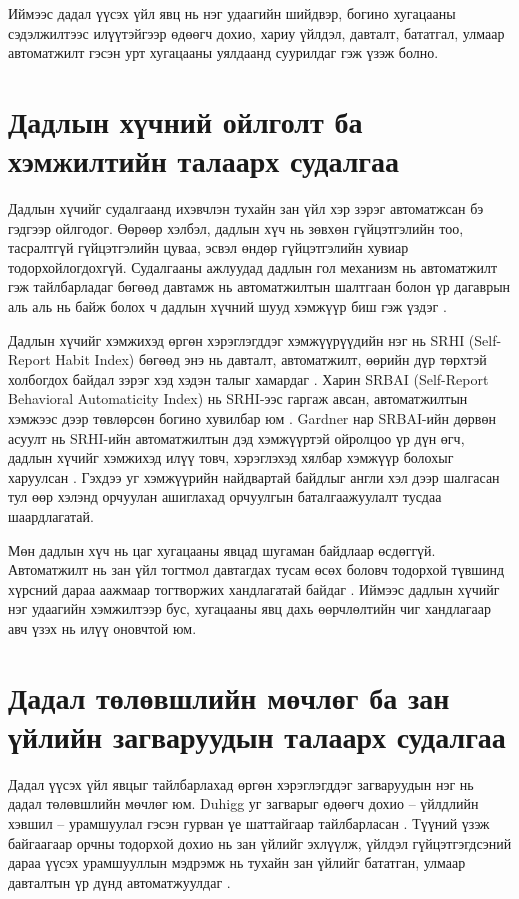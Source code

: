 Иймээс дадал үүсэх үйл явц нь нэг удаагийн шийдвэр, богино хугацааны сэдэлжилтээс илүүтэйгээр өдөөгч дохио, хариу үйлдэл, давталт, бататгал, улмаар автоматжилт гэсэн урт хугацааны уялдаанд суурилдаг гэж үзэж болно.

\section{Дадлын хүчний ойлголт ба хэмжилтийн талаарх судалгаа}

Дадлын хүчийг судалгаанд ихэвчлэн тухайн зан үйл хэр зэрэг автоматжсан бэ гэдгээр ойлгодог. Өөрөөр хэлбэл, дадлын хүч нь зөвхөн гүйцэтгэлийн тоо, тасралтгүй гүйцэтгэлийн цуваа, эсвэл өндөр гүйцэтгэлийн хувиар тодорхойлогдохгүй. Судалгааны ажлуудад дадлын гол механизм нь автоматжилт гэж тайлбарладаг бөгөөд давтамж нь автоматжилтын шалтгаан болон үр дагаврын аль аль нь байж болох ч дадлын хүчний шууд хэмжүүр биш гэж үздэг \cite{ref1}.

Дадлын хүчийг хэмжихэд өргөн хэрэглэгддэг хэмжүүрүүдийн нэг нь SRHI (Self-Report Habit Index) бөгөөд энэ нь давталт, автоматжилт, өөрийн дүр төрхтэй холбогдох байдал зэрэг хэд хэдэн талыг хамардаг \cite{ref8}. Харин SRBAI (Self-Report Behavioral Automaticity Index) нь SRHI-ээс гаргаж авсан, автоматжилтын хэмжээс дээр төвлөрсөн богино хувилбар юм \cite{ref9}. Gardner нар SRBAI-ийн дөрвөн асуулт нь SRHI-ийн автоматжилтын дэд хэмжүүртэй ойролцоо үр дүн өгч, дадлын хүчийг хэмжихэд илүү товч, хэрэглэхэд хялбар хэмжүүр болохыг харуулсан \cite{ref9}. Гэхдээ уг хэмжүүрийн найдвартай байдлыг англи хэл дээр шалгасан тул өөр хэлэнд орчуулан ашиглахад орчуулгын баталгаажуулалт тусдаа шаардлагатай.

Мөн дадлын хүч нь цаг хугацааны явцад шугаман байдлаар өсдөггүй. Автоматжилт нь зан үйл тогтмол давтагдах тусам өсөх боловч тодорхой түвшинд хүрсний дараа аажмаар тогтворжих хандлагатай байдаг \cite{ref6}. Иймээс дадлын хүчийг нэг удаагийн хэмжилтээр бус, хугацааны явц дахь өөрчлөлтийн чиг хандлагаар авч үзэх нь илүү оновчтой юм.

\section{Дадал төлөвшлийн мөчлөг ба зан үйлийн загваруудын талаарх судалгаа}

Дадал үүсэх үйл явцыг тайлбарлахад өргөн хэрэглэгддэг загваруудын нэг нь дадал төлөвшлийн мөчлөг юм. Duhigg уг загварыг өдөөгч дохио -- үйлдлийн хэвшил -- урамшуулал гэсэн гурван үе шаттайгаар тайлбарласан \cite{ref2}. Түүний үзэж байгаагаар орчны тодорхой дохио нь зан үйлийг эхлүүлж, үйлдэл гүйцэтгэгдсэний дараа үүсэх урамшууллын мэдрэмж нь тухайн зан үйлийг бататган, улмаар давталтын үр дүнд автоматжуулдаг \cite{ref2}.


